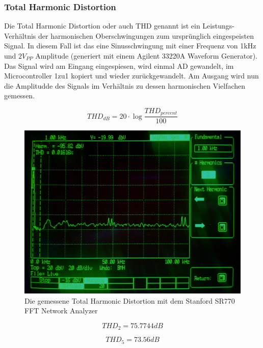 \subsubsection{Total Harmonic Distortion}
\label{subsubsec:Total Harmonic Distortion}
Die Total Harmonic Distortion oder auch THD genannt ist ein Leistungs-Verhältnis der harmonischen Oberschwingungen zum ursprünglich  eingespeisten Signal. In diesem Fall ist das eine Sinusschwingung mit einer Frequenz von 1kHz und $2\si{V_{PP}}$ Amplitude (generiert mit einem Agilent 33220A Waveform Generator). Das Signal wird am Eingang eingespiesen, wird einmal AD gewandelt, im Microcontroller 1zu1 kopiert und wieder zurückgewandelt. Am Ausgang wird nun die Amplitudde des Signals im Verhältnis zu dessen harmonischen Vielfachen gemessen.

\begin{equation}
THD_{dB}=20\cdot \log{\frac{THD_{percent}}{100}}
\end{equation} 

\begin{figure} [H]
\begin{center}
 \includegraphics[scale=0.1]{../graphics/THD.jpg}
 \caption{Die gemessene Total Harmonic Distortion mit dem Stanford SR770 FFT Network Analyzer}
\label{fig:thd}
\end{center}
\end{figure}

\begin{equation}
THD_2=75.7744\si{dB}
\end{equation} 

\begin{equation}
THD_5=73.56\si{dB}
\end{equation} 

